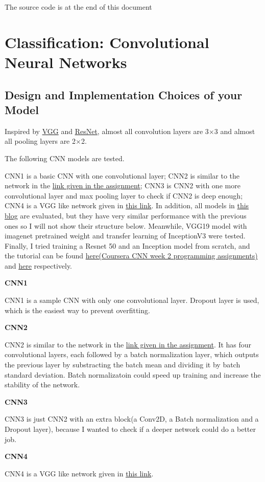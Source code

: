\documentclass[12pt]{article}
\begin{document}
\noindent
{\LARGE The source code is at the end of this document}
\section{Classification: Convolutional Neural Networks}

\subsection{Design and Implementation Choices of your Model}

Inspired by \href{https://arxiv.org/pdf/1409.1556.pdf}{VGG} and \href{https://arxiv.org/pdf/1512.03385.pdf}{ResNet}, almost all convolution layers are 3$\times$3 and almost all pooling layers are 2$\times$2.

The following CNN models are tested. 

CNN1 is a basic CNN with one convolutional layer; CNN2 is similar to the network in the \href{https://www.kaggle.com/fuzzywizard/fashion-mnist-cnn-keras-accuracy-93/}{link given in the assignment}; CNN3 is CNN2 with one more convolutional layer and max pooling layer to check if CNN2 is deep enough; CNN4 is a VGG like network given in \href{http://proc-x.com/2017/09/a-vgg-like-cnn-for-fashion-mnist-with-94-accuracy/}{this link}. In addition, all models in \href{https://solvemprobler.com/blog/2017/09/29/range-of-convolutional-neural-networks-on-fashion-mnist-dataset/}{this blog} are evaluated, but they have very similar performance with the previous ones so I will not show their structure below. Meanwhile, VGG19 model with imagenet pretrained weight and transfer learning of InceptionV3 were tested. Finally, I tried training a Resnet 50 and an Inception model from scratch, and the tutorial can be found \href{https://www.coursera.org/learn/convolutional-neural-networks?specialization=deep-learning#syllabus}{here(Coursera CNN week 2 programming assignments)} and \href{https://machinelearningmastery.com/how-to-implement-major-architecture-innovations-for-convolutional-neural-networks/}{here} respectively.

\textbf{CNN1}

CNN1 is a sample CNN with only one convolutional layer. Dropout layer is used, which is the easiest way to prevent overfitting.

\textbf{CNN2}

CNN2 is similar to the network in the \href{https://www.kaggle.com/fuzzywizard/fashion-mnist-cnn-keras-accuracy-93/}{link given in the assignment}. It has four convolutional layers, each followed by a batch normalization layer, which outputs the previous layer by substracting the batch mean and dividing it by batch standard deviation. Batch normalizatoin could speed up training and increase the stability of the network.

\textbf{CNN3}

CNN3 is just CNN2 with an extra block(a Conv2D, a Batch normalization and a Dropout layer), because I wanted to check if a deeper network could do a better job.

\textbf{CNN4}

CNN4 is a VGG like network given in \href{http://proc-x.com/2017/09/a-vgg-like-cnn-for-fashion-mnist-with-94-accuracy/}{this link}.
\end{document}
